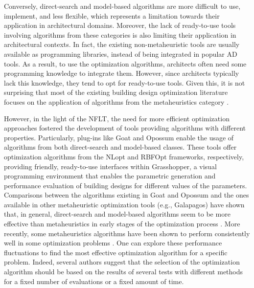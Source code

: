 	Conversely, direct-search and model-based algorithms are more difficult to use, implement, and less flexible, which represents a limitation towards their application in architectural domains. Moreover, the lack of ready-to-use tools involving algorithms from these categories is also limiting their application in architectural contexts. In fact, the existing non-metaheuristic tools are usually available as programming libraries, instead of being integrated in popular \ac{AD} tools. As a result, to use the optimization algorithms, architects often need some programming knowledge to integrate them. However, since architects typically lack this knowledge, they tend to opt for ready-to-use tools. Given this, it is not surprising that most of the existing building design optimization literature focuses on the application of algorithms from the metaheuristics category \cite{Evins2013,Nguyen2014,Hamdy2016}. 


	However, in the light of the \ac{NFLT}, the need for more efficient optimization approaches fostered the development of tools providing algorithms with different properties. Particularly, plug-ins like Goat and Opossum enable the usage of algorithms from both direct-search and model-based classes. These tools offer optimization algorithms from the NLopt and RBFOpt frameworks, respectively, providing friendly, ready-to-use interfaces within Grasshopper, a visual programming environment that enables the parametric generation and performance evaluation of building designs for different values of the parameters. Comparisons between the algorithms existing in Goat and Opossum and the ones available in other metaheuristic optimization tools (e.g., Galapagos) have shown that, in general, direct-search and model-based algorithms seem to be more effective than metaheuristics in early stages of the optimization process \cite{Wortmann2017,Wortmann2017GABESTCHOICE}. More recently, some metaheuristics algorithms have been shown to perform consistently well in some optimization problems \cite{Waibel2018}. One can explore these performance fluctuations to find the most effective optimization algorithm for a specific problem. Indeed, several authors suggest that the selection of the optimization algorithm should be based on the results of several tests with different methods for a fixed number of evaluations or a fixed amount of time\cite{Hamdy2016, Wortmann2016BBO}. 
	
